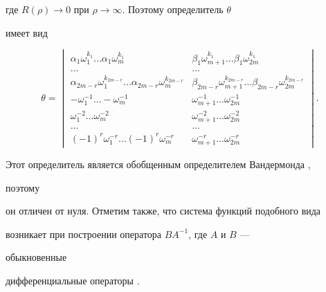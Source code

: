 где $R(\rho)\to 0$ при $\rho\to \infty$. Поэтому определитель $\theta$ 


имеет вид 


$$ 


\theta= 


\begin{vmatrix} 


\alpha_1\omega_1^{k_1}\dots \alpha_1\omega_m^{k_1} & 


\beta_1\omega_{m+1}^{k_1}\dots \beta_1\omega_{2m}^{k_1}\\ 


\dots & \dots \\




\alpha_{2m-r}\omega_1^{k_{2m-r}}\dots \alpha_{2m-r}\omega_m^{k_{2m-r}}& 


\beta_{2m-r}\omega_{m+1}^{k_{2m-r}}\dots \beta_{2m-r} 


\omega_{2m}^{k_{2m-r}}\\ 


-\omega_1^{-1}\dots-\omega_m^{-1} & \omega_{m+1}^{-1}\dots\omega_{2m}^{-1}\\ 


\omega_1^{-2}\dots\omega_m^{-2} & \omega_{m+1}^{-2}\dots\omega_{2m}^{-2}\\ 


\dots & \dots \\




(-1)^r\omega_1^{-r}\dots (-1)^r\omega_m^{-r} & 


\omega_{m+1}^{-r}\dots \omega_{2m}^{-r} 


\end{vmatrix} 


. 


$$ 


Этот определитель является обобщенным определителем Вандермонда \cite{Pol},


поэтому 


он отличен от нуля. Отметим также, что система функций подобного вида 


возникает при построении оператора $BA^{-1}$, где $A$ и $B$ --- 


обыкновенные 


дифференциальные операторы \cite{Sil}. 


 


